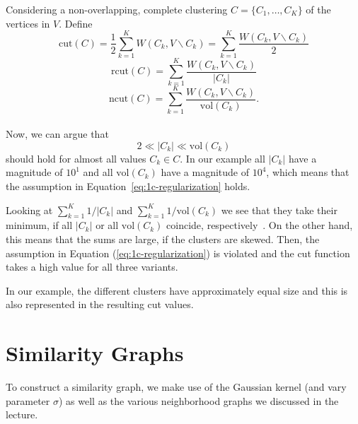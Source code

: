 \documentclass{support/acm_proc_article-sp}
\begin{document}
    Considering a non-overlapping, complete clustering $C = \{C_1,\ldots, C_K\}$ of the vertices in $V$.
    Define
    \begin{equation*}
        \mbox{cut}(C) = \frac{1}{2} \sum_{k=1}^K W(C_k, V \backslash C_k) = \sum_{k=1}^K \frac{W(C_k, V \backslash C_k)}{2}
    \end{equation*}
    \begin{equation*}
        \mbox{rcut}(C) = \sum_{k=1}^K \frac{W(C_k, V \backslash C_k)}{|C_k|}
    \end{equation*}
    \begin{equation*}
        \mbox{ncut}(C) = \sum_{k=1}^K \frac{W(C_k, V \backslash C_k)}{\mbox{vol}(C_k)}.
    \end{equation*} \\
    Now, we can argue that
    \begin{equation}
        2 \ll |C_k| \ll \mbox{vol}(C_k)
        \label{eq:1c-regularization}
    \end{equation}
    should hold for almost all values $C_k \in C$.
    In our example all $|C_k|$ have a magnitude of $10^1$ and all $\mbox{vol}(C_k)$ have a magnitude of
    $10^4$, which means that the assumption in Equation~\ref{eq:1c-regularization} holds.

    Looking at $\sum_{k=1}^K 1/|C_k|$ and $\sum_{k=1}^K 1/\mbox{vol}(C_k)$ we see that they
    take their minimum, if all $|C_k|$ or all $\mbox{vol}(C_k)$ coincide, respectively~\cite[cf.p.9]{Luxburg2007}.
    On the other hand, this means that the sums are large, if the clusters are skewed.
    Then, the assumption in Equation (\ref{eq:1c-regularization}) is violated and the cut function takes a high
    value for all three variants.

    In our example, the different clusters have approximately equal size and this is also represented in the resulting
    cut values.


    \section{Similarity Graphs}

    To construct a similarity graph, we make use of the Gaussian kernel (and vary parameter $\sigma$) as well as
    the various neighborhood graphs we discussed in the lecture.
\end{document}
